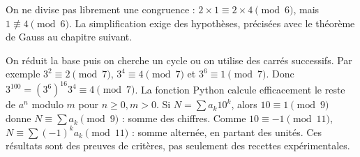 \begin{attention}
On ne divise pas librement une congruence : $2\times1\equiv2\times4\pmod6$, mais $1\not\equiv4\pmod6$.
La simplification exige des hypothèses, précisées avec le théorème de Gauss au chapitre suivant.
\end{attention}
On réduit la base puis on cherche un cycle ou on utilise des carrés successifs. Par exemple $3^2\equiv2\pmod7$, $3^4\equiv4\pmod7$ et $3^6\equiv1\pmod7$.
Donc $3^{100}= (3^6)^{16}3^4\equiv4\pmod7$.
La fonction Python  calcule efficacement le reste de $a^n$ modulo $m$ pour $n\geq0,m>0$.
Si $N=\sum a_k10^k$, alors $10\equiv1\pmod9$ donne $N\equiv\sum a_k\pmod9$ : somme des chiffres.
Comme $10\equiv-1\pmod{11}$, $N\equiv\sum(-1)^ka_k\pmod{11}$ : somme alternée, en partant des unités.
Ces résultats sont des preuves de critères, pas seulement des recettes expérimentales.

